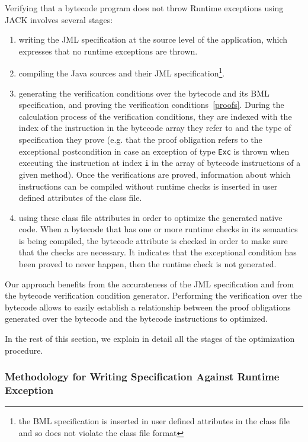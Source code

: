Verifying that a bytecode program does not throw Runtime exceptions using JACK involves several stages:
\begin{enumerate}
\item writing the JML specification at the source level of the application, which expresses that no runtime exceptions are thrown.
\item compiling the Java sources and their JML specification\footnote{the BML specification is inserted in user defined attributes in the class file and so does not violate the class file format}.
\item generating the verification conditions over the bytecode and its BML specification, and proving the verification conditions~\ref{proofs}. During the calculation process of the verification conditions, they are indexed with the index of the instruction in the bytecode array they refer to and the type of specification they prove (e.g. that the proof obligation refers to the exceptional postcondition in case an exception of type \texttt{Exc} is thrown when executing the instruction at index \texttt{i} in the array of bytecode instructions of a given method). Once the verifications are proved, information about which instructions can be compiled without runtime checks is inserted in user defined attributes of the class file.
\item using these class file attributes in order to optimize the generated native code. When a bytecode that has one or more runtime checks in its semantics is being compiled, the bytecode attribute is checked in order to make sure that the checks are necessary. It indicates that the exceptional condition has been proved to never happen, then the runtime check is not generated.
\end{enumerate}

Our approach benefits from the accurateness of the JML specification and from the bytecode verification condition generator. Performing the verification over the bytecode allows to easily establish a relationship between the proof obligations generated over the bytecode and the bytecode instructions to optimized.

In the rest of this section, we explain in detail all the stages of the optimization procedure.

\subsubsection{Methodology for Writing Specification Against Runtime Exception}

